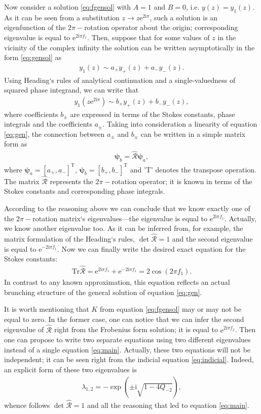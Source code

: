 \documentclass[aip,jmp,reprint]{revtex4-1}
\def\rmi{\mathrm{i}}
\def\rme{\mathrm{e}}
\def\R{\widehat{\mathcal{R}}}
\def\psii{\bm\psi}
\def\T{\mathrm{T}}
\def\Tr{\mathrm{Tr}}
\begin{document}
Now consider a solution \eqref{eq:fgensol} with $A=1$ and $B=0$, i.e. $y(z)=y_1(z)$. 
As it can be seen from a substitution \mbox{$z \rightarrow z \rme^{2 \rmi \pi}$}, 
such a solution is an eigenfunction of the $2\pi-$rotation operator about the origin; 
corresponding eigenvalue is equal to $\rme^{2 \rmi \pi f_1}$.  
Then, suppose that for some values of $z$ in the vicinity of the complex infinity 
the solution can be written asymptotically in the form \eqref{eq:gensol} as
\begin{eqnarray}
y_1(z) \sim a_+y_+(z) + a_-y_-(z).
\end{eqnarray}
Using Heading`s rules of analytical continuation\cite{heading, rwbook} and a single-valuedness 
of squared phase integrand, we can write that
\begin{eqnarray}
y_1(z \rme^{2 \rmi \pi}) \sim b_+y_+(z) + b_-y_-(z),
\end{eqnarray}
where coefficients $b_{\pm}$ are expressed in terms of the Stokes constants, phase integrals and 
the coefficients $a_{\pm}$. Taking into consideration a linearity of equation \eqref{eq:gen}, 
the connection between $a_{\pm}$ and $b_{\pm}$ can be written in a simple matrix form as
\begin{eqnarray}
\psii_b = \R \psii_a,
\end{eqnarray}
where $\psii_a = [{a_+,a_-}]^{\T}$, $\psii_b = [{b_+,b_-}]^{\T}$ and 'T' denotes the transpose operation.
The matrix $\R$ represents the $2\pi-$rotation operator; it is known in terms of
the Stokes constants and corresponding phase integrals. 

According to the reasoning above we can conclude
that we know exactly one of the $2\pi-$rotation matrix`s eigenvalues---the eigenvalue is 
equal to $\rme^{2 \rmi \pi f_1}$. Actually, we know another eigenvalue too. 
As it can be inferred from, for example, the matrix formulation 
of the Heading`s rules\cite{aksymm}, $\det\R=1$ and the second eigenvalue is equal 
to $\rme^{-2 \rmi \pi f_1}$. Now we can finally write the desired exact equation for the Stokes constants:
\begin{eqnarray}
\Tr\R = \rme^{2 \rmi \pi f_1} + \rme^{-2 \rmi \pi f_1} = 2 \cos(2 \pi f_1).
\label{eq:main}
\end{eqnarray}
In contrast to any known approximation, this equation reflects an actual brunching structure 
of the general solution of equation \eqref{eq:gen}.

It is worth mentioning that $K$ from equation \eqref{eq:fgensol} may or may not be equal to zero. In the
former case, one can notice that we can infer the second eigenvalue of $\R$ right from the
Frobenius form solution; it is equal to $\rme^{2 \rmi \pi f_2}$. Then one can propose to write two
separate equations using two different eigenvalues instead of a single equation \eqref{eq:main}.
Actually, these two equations will not be independent; it can be seen right from the
indicial equation \eqref{eq:indicial}. Indeed, an explicit form of these two eigenvalues is
\begin{eqnarray}
\lambda_{1,2} = - \exp(\pm \rmi \sqrt{1 - 4 Q_{-2}}),
\end{eqnarray}
whence follows $\det\R=1$ and all the reasoning that led to equation \eqref{eq:main}.
\end{document}
